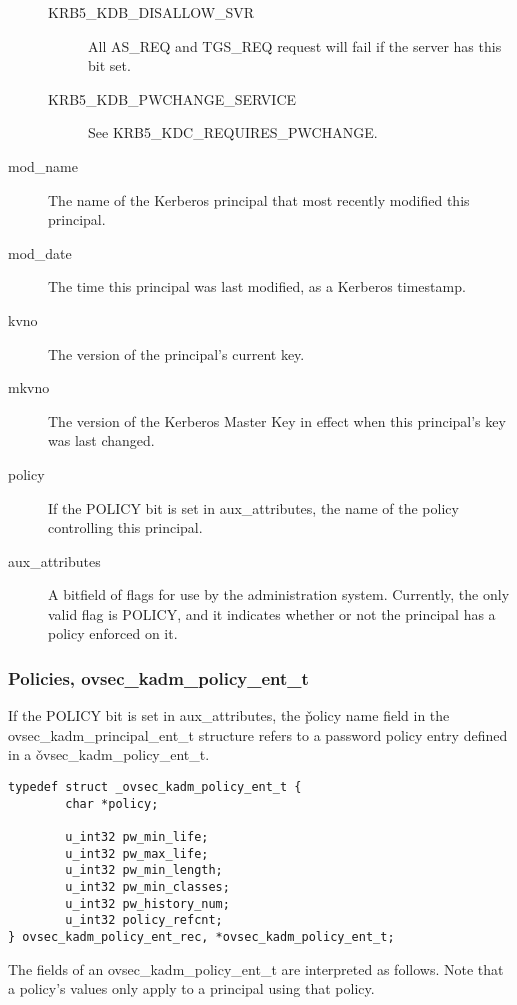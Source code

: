 \begin{description}
\begin{description}
\item[KRB5_KDB_DISALLOW_SVR] All AS_REQ and TGS_REQ request will fail
if the server has this bit set.

\item[KRB5_KDB_PWCHANGE_SERVICE] See KRB5_KDC_REQUIRES_PWCHANGE.
\end{description}

\item[mod_name] The name of the Kerberos principal that most recently
modified this principal.

\item[mod_date] The time this principal was last modified, as a Kerberos
timestamp.

\item[kvno] The version of the principal's current key.

\item[mkvno] The version of the Kerberos Master Key in effect when
this principal's key was last changed.

\item[policy] If the POLICY bit is set in aux_attributes, the name
of the policy controlling this principal.

\item[aux_attributes]  A bitfield of flags for use by the
administration system.  Currently, the only valid flag is POLICY, and
it indicates whether or not the principal has a policy enforced on it.
\end{description}

\subsubsection{Policies, ovsec_kadm_policy_ent_t}
\label{sec:policy-fields}

If the POLICY bit is set in aux_attributes, the \v{policy} name field
in the ovsec_kadm_principal_ent_t structure refers to a password
policy entry defined in a \v{ovsec_kadm_policy_ent_t}.

\begin{verbatim}
typedef struct _ovsec_kadm_policy_ent_t {
        char *policy;

        u_int32 pw_min_life;
        u_int32 pw_max_life;
        u_int32 pw_min_length;
        u_int32 pw_min_classes;
        u_int32 pw_history_num;
        u_int32 policy_refcnt;
} ovsec_kadm_policy_ent_rec, *ovsec_kadm_policy_ent_t;
\end{verbatim}

The fields of an ovsec_kadm_policy_ent_t are interpreted as follows.
Note that a policy's values only apply to a principal using that
policy.

